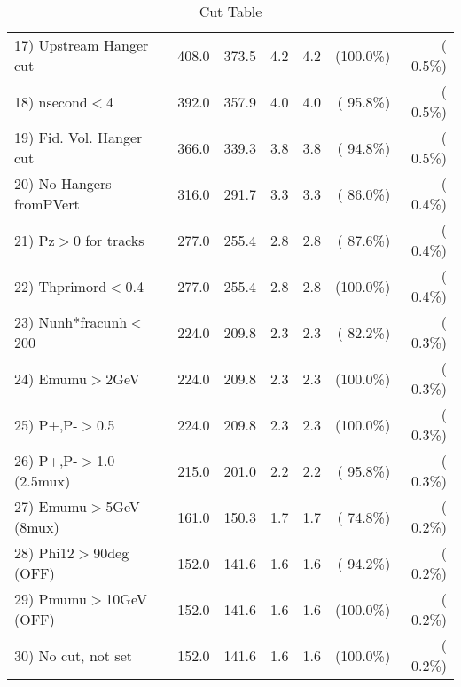 \begin{table}[h!]
\begin{tabular}{||l||r|r|r|r|r|r||}
 17) Upstream Hanger cut  &        408.0 &        373.5 &          4.2 &          4.2 & (100.0\%) & (  0.5\%) \\
 18) nsecond$<$4          &        392.0 &        357.9 &          4.0 &          4.0 & ( 95.8\%) & (  0.5\%) \\
 19) Fid. Vol. Hanger cut &        366.0 &        339.3 &          3.8 &          3.8 & ( 94.8\%) & (  0.5\%) \\
 20) No Hangers fromPVert &        316.0 &        291.7 &          3.3 &          3.3 & ( 86.0\%) & (  0.4\%) \\
 21) Pz$>$0 for tracks    &        277.0 &        255.4 &          2.8 &          2.8 & ( 87.6\%) & (  0.4\%) \\
 22) Thprimord$<$0.4      &        277.0 &        255.4 &          2.8 &          2.8 & (100.0\%) & (  0.4\%) \\
 23) Nunh*fracunh$<$200   &        224.0 &        209.8 &          2.3 &          2.3 & ( 82.2\%) & (  0.3\%) \\
 24) Emumu$>$2GeV         &        224.0 &        209.8 &          2.3 &          2.3 & (100.0\%) & (  0.3\%) \\
 25) P+,P-$>$0.5          &        224.0 &        209.8 &          2.3 &          2.3 & (100.0\%) & (  0.3\%) \\
 26) P+,P-$>$1.0 (2.5mux) &        215.0 &        201.0 &          2.2 &          2.2 & ( 95.8\%) & (  0.3\%) \\
 27) Emumu$>$5GeV  (8mux) &        161.0 &        150.3 &          1.7 &          1.7 & ( 74.8\%) & (  0.2\%) \\
 28) Phi12$>$90deg  (OFF) &        152.0 &        141.6 &          1.6 &          1.6 & ( 94.2\%) & (  0.2\%) \\
 29) Pmumu$>$10GeV  (OFF) &        152.0 &        141.6 &          1.6 &          1.6 & (100.0\%) & (  0.2\%) \\
 30) No cut, not set      &        152.0 &        141.6 &          1.6 &          1.6 & (100.0\%) & (  0.2\%) \\
 \hline
 \hline
 \end{tabular}
 \caption{Cut Table           }
 \label{tab-cutcohjpsi-mumu_anuecc}
 \end{table}
